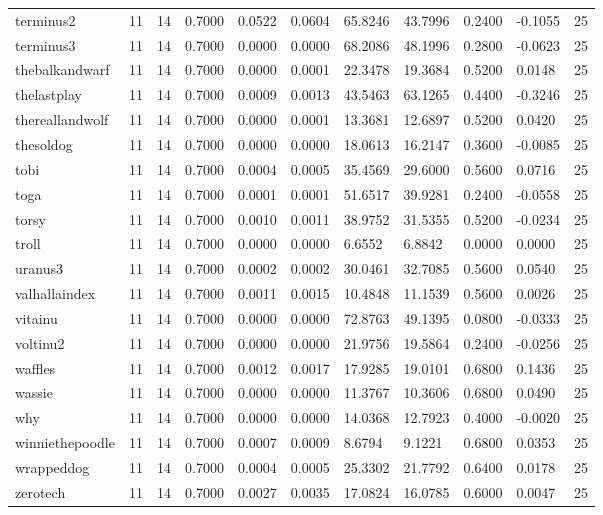 \begin{table}[htbp]
\begin{tabular}{lllllllllll}
terminus2 & 11 & 14 & 0.7000 & 0.0522 & 0.0604 & 65.8246 & 43.7996 & 0.2400 & -0.1055 & 25 \\
terminus3 & 11 & 14 & 0.7000 & 0.0000 & 0.0000 & 68.2086 & 48.1996 & 0.2800 & -0.0623 & 25 \\
thebalkandwarf & 11 & 14 & 0.7000 & 0.0000 & 0.0001 & 22.3478 & 19.3684 & 0.5200 & 0.0148 & 25 \\
thelastplay & 11 & 14 & 0.7000 & 0.0009 & 0.0013 & 43.5463 & 63.1265 & 0.4400 & -0.3246 & 25 \\
thereallandwolf & 11 & 14 & 0.7000 & 0.0000 & 0.0001 & 13.3681 & 12.6897 & 0.5200 & 0.0420 & 25 \\
thesoldog & 11 & 14 & 0.7000 & 0.0000 & 0.0000 & 18.0613 & 16.2147 & 0.3600 & -0.0085 & 25 \\
tobi & 11 & 14 & 0.7000 & 0.0004 & 0.0005 & 35.4569 & 29.6000 & 0.5600 & 0.0716 & 25 \\
toga & 11 & 14 & 0.7000 & 0.0001 & 0.0001 & 51.6517 & 39.9281 & 0.2400 & -0.0558 & 25 \\
torsy & 11 & 14 & 0.7000 & 0.0010 & 0.0011 & 38.9752 & 31.5355 & 0.5200 & -0.0234 & 25 \\
troll & 11 & 14 & 0.7000 & 0.0000 & 0.0000 & 6.6552 & 6.8842 & 0.0000 & 0.0000 & 25 \\
uranus3 & 11 & 14 & 0.7000 & 0.0002 & 0.0002 & 30.0461 & 32.7085 & 0.5600 & 0.0540 & 25 \\
valhallaindex & 11 & 14 & 0.7000 & 0.0011 & 0.0015 & 10.4848 & 11.1539 & 0.5600 & 0.0026 & 25 \\
vitainu & 11 & 14 & 0.7000 & 0.0000 & 0.0000 & 72.8763 & 49.1395 & 0.0800 & -0.0333 & 25 \\
voltinu2 & 11 & 14 & 0.7000 & 0.0000 & 0.0000 & 21.9756 & 19.5864 & 0.2400 & -0.0256 & 25 \\
waffles & 11 & 14 & 0.7000 & 0.0012 & 0.0017 & 17.9285 & 19.0101 & 0.6800 & 0.1436 & 25 \\
wassie & 11 & 14 & 0.7000 & 0.0000 & 0.0000 & 11.3767 & 10.3606 & 0.6800 & 0.0490 & 25 \\
why & 11 & 14 & 0.7000 & 0.0000 & 0.0000 & 14.0368 & 12.7923 & 0.4000 & -0.0020 & 25 \\
winniethepoodle & 11 & 14 & 0.7000 & 0.0007 & 0.0009 & 8.6794 & 9.1221 & 0.6800 & 0.0353 & 25 \\
wrappeddog & 11 & 14 & 0.7000 & 0.0004 & 0.0005 & 25.3302 & 21.7792 & 0.6400 & 0.0178 & 25 \\
zerotech & 11 & 14 & 0.7000 & 0.0027 & 0.0035 & 17.0824 & 16.0785 & 0.6000 & 0.0047 & 25 \\

\end{tabular}
\end{table}
